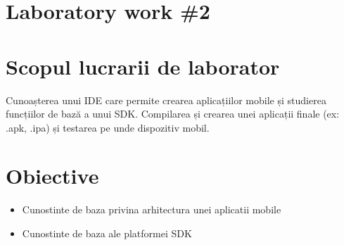 \section*{Laboratory work \#2}

\section{Scopul lucrarii de laborator}
	Cunoașterea unui IDE care permite crearea aplicațiilor mobile și studierea funcțiilor de bază a unui SDK. Compilarea și crearea unei aplicații finale (ex: .apk, .ipa) și testarea pe unde dispozitiv mobil.

\section{Obiective}

	\begin{itemize}
		\item Cunostinte de baza privina arhitectura unei aplicatii mobile
		\item Cunostinte de baza ale platformei SDK
	\end{itemize}

\clearpage
